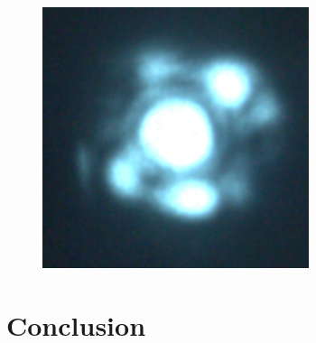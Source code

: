 \documentclass[aps,twocolumn,secnumarabic,balancelastpage,amsmath,amssymb,nofootinbib]{revtex4}
\begin{document}
\begin{figure}
  \includegraphics[width=7.8cm]{flower3.png}
  \caption{}
  \label{flower1}
\end{figure}

\section{Conclusion}


\end{document}
